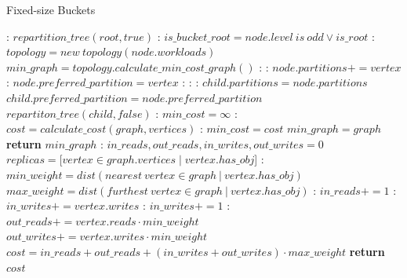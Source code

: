 \begin{algorithm}
  \caption{Fixed-size Buckets}\label{alg:fixed-size}
  \begin{algorithmic}[1]
    :
  \State $repartition\_tree(root, true)$
  \EndFunction
  :
  \State $is\_bucket\_root = node.level\ is\ odd \vee is\_root$
    :
      \State $topology = new\ topology(node.workloads)$
      \State $min\_graph =  topology.calculate\_min\_cost\_graph()$
      :
        :
        \State $node.partitions += vertex$
          :
            \State $node.preferred\_partition = vertex$
          \EndIf
        \EndIf
      \EndFor
    \EndIf
    :
      :
      :
        \State $child.partitions = node.partitions$
        \State $child.preferred\_partition = node.preferred\_partition$
      \EndIf
        \State $repartiton\_tree(child, false)$
        \EndFor
    \EndIf
    \EndFunction
    :
    \State $min\_cost = \infty$
      :
        \State $cost = calculate\_cost(graph, vertices)$
        :
          \State $min\_cost = cost$
          \State $min\_graph = graph$
        \EndIf
      \EndFor
    \State \textbf{return} $min\_graph$
    \EndFunction
    :
      \State $in\_reads, out\_reads, in\_writes, out\_writes = 0$
      \State $replicas = [vertex \in graph.vertices \mid vertex.has\_obj$]
      :
      \State $min\_weight = dist(nearest\ vertex \in graph\ |\  vertex.has\_obj)$
      \State $max\_weight = dist(furthest\ vertex \in graph\ |\ vertex.has\_obj)$
        :
          \State $in\_reads+= 1$
          :
          \State $in\_writes+= vertex.writes$
          \Else:
          \State  $in\_writes+= 1 $
          \EndIf
        \Else:
          \State $out\_reads += vertex.reads \cdot min\_weight$
          \State $out\_writes += vertex.writes \cdot min\_weight$
        \EndIf
      \EndFor
      \State $cost = in\_reads+ out\_reads + (in\_writes+ out\_writes) \cdot max\_weight$
      \State \textbf{return} $cost$
  \EndFunction
  \end{algorithmic}
  \end{algorithm}

